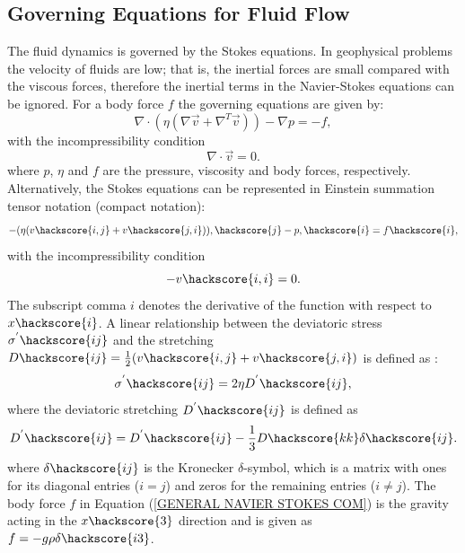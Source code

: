 \subsection{Governing Equations for Fluid Flow}

The fluid dynamics is governed by the Stokes equations. In geophysical problems the velocity of fluids are low; that is, the inertial forces are small compared with the viscous forces, therefore the inertial terms in the Navier-Stokes equations can be ignored. For a body force $f$ the governing equations are given by:
%
\begin{equation}
\nabla \cdot (\eta(\nabla \vec{v} + \nabla^{T} \vec{v})) - \nabla p = -f,
\label{GENERAL NAVIER STOKES}
\end{equation}
%
with the incompressibility condition
%
\begin{equation}
\nabla \cdot \vec{v} = 0.
\label{INCOMPRESSIBILITY}
\end{equation}
%
where $p$, $\eta$ and $f$ are the pressure, viscosity and body forces, respectively. 
Alternatively, the Stokes equations can be represented in Einstein summation tensor notation (compact notation):
%
\begin{equation}
-(\eta(v\hackscore{i,j} + v\hackscore{j,i})),\hackscore{j} - p,\hackscore{i} = f\hackscore{i},
\label{GENERAL NAVIER STOKES COM}
\end{equation}
%
with the incompressibility condition
%
\begin{equation}
-v\hackscore{i,i} = 0.
\label{INCOMPRESSIBILITY COM}
\end{equation}
%
The subscript comma $i$ denotes the derivative of the function with respect to $x\hackscore{i}$. A linear relationship between the deviatoric stress $\sigma^{'}\hackscore{ij}$ and the stretching $D\hackscore{ij} = \frac{1}{2}(v\hackscore{i,j} + v\hackscore{j,i})$ is defined as \cite{GROSS2006}:
%
\begin{equation}
\sigma^{'}\hackscore{ij} = 2\eta D^{'}\hackscore{ij},
\label{STRESS}
\end{equation}
%
where the deviatoric stretching $D^{'}\hackscore{ij}$ is defined as
%
\begin{equation}
D^{'}\hackscore{ij} = D^{'}\hackscore{ij} - \frac{1}{3}D\hackscore{kk}\delta\hackscore{ij}.
\label{DEVIATORIC STRETCHING}
\end{equation}
%
where $\delta\hackscore{ij}$ is the Kronecker $\delta$-symbol, which is a matrix with ones for its diagonal entries ($i = j$) and zeros for the remaining entries ($i \neq j$). The body force $f$ in Equation (\ref{GENERAL NAVIER STOKES COM}) is the gravity acting in the $x\hackscore{3}$ direction and is given as $f = -g \rho \delta\hackscore{i3}$.

